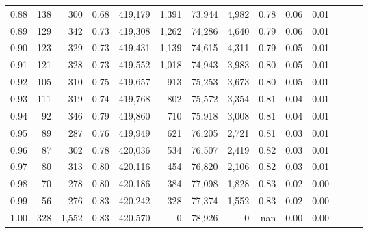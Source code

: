 \begin{tabular}{rrrrrrrrrrrrrr}
0.88 &     138 &    300 &  0.68 &  419,179 &    1,391 &  73,944 &   4,982 &  0.78 &  0.06 &      0.01 \\
0.89 &     129 &    342 &  0.73 &  419,308 &    1,262 &  74,286 &   4,640 &  0.79 &  0.06 &      0.01 \\
0.90 &     123 &    329 &  0.73 &  419,431 &    1,139 &  74,615 &   4,311 &  0.79 &  0.05 &      0.01 \\
0.91 &     121 &    328 &  0.73 &  419,552 &    1,018 &  74,943 &   3,983 &  0.80 &  0.05 &      0.01 \\
0.92 &     105 &    310 &  0.75 &  419,657 &      913 &  75,253 &   3,673 &  0.80 &  0.05 &      0.01 \\
0.93 &     111 &    319 &  0.74 &  419,768 &      802 &  75,572 &   3,354 &  0.81 &  0.04 &      0.01 \\
0.94 &      92 &    346 &  0.79 &  419,860 &      710 &  75,918 &   3,008 &  0.81 &  0.04 &      0.01 \\
0.95 &      89 &    287 &  0.76 &  419,949 &      621 &  76,205 &   2,721 &  0.81 &  0.03 &      0.01 \\
0.96 &      87 &    302 &  0.78 &  420,036 &      534 &  76,507 &   2,419 &  0.82 &  0.03 &      0.01 \\
0.97 &      80 &    313 &  0.80 &  420,116 &      454 &  76,820 &   2,106 &  0.82 &  0.03 &      0.01 \\
0.98 &      70 &    278 &  0.80 &  420,186 &      384 &  77,098 &   1,828 &  0.83 &  0.02 &      0.00 \\
0.99 &      56 &    276 &  0.83 &  420,242 &      328 &  77,374 &   1,552 &  0.83 &  0.02 &      0.00 \\
1.00 &     328 &  1,552 &  0.83 &  420,570 &        0 &  78,926 &       0 &   nan &  0.00 &      0.00 \\
\bottomrule
\end{tabular}
